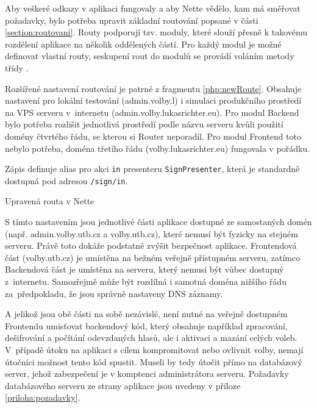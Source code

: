 Aby veškeré odkazy v aplikaci fungovaly a aby Nette vědělo, kam má směřovat požadavky, bylo potřeba upravit základní routování popsané v části \ref{section:routovani}. Routy podporují tzv. moduly, které slouží přesně k takovému rozdělení aplikace na několik oddělených částí. Pro každý modul je možné definovat vlastní routy, seskupení rout do modulů se provádí voláním metody  %
třídy . 

\bigskip

Rozšířené nastavení routování je patrné z fragmentu \ref{php:newRoute}. Obsahuje nastavení pro lokální testování (admin.volby.l) i simulaci produkčního prostředí na VPS serveru v~internetu (admin.volby.lukasrichter.eu). Pro modul Backend bylo potřeba rozlišit jednotlivá prostředí podle názvu serveru kvůli použití domény čtvrtého řádu, se kterou si Router neporadil. Pro modul Frontend toto nebylo potřeba, doména třetího řádu (volby.lukasrichter.eu) fungovala v pořádku. 

Zápis  definuje alias pro akci \texttt{in} presenteru \texttt{SignPresenter}, která je standardně dostupná pod adresou \texttt{/sign/in}.
\clearpage

\begin{listing}[ht]
\caption{Upravená routa v Nette}
\label{php:newRoute}
\end{listing}

S tímto nastavením jsou jednotlivé části aplikace dostupné ze samostaných domén (např. admin.volby.utb.cz a volby.utb.cz), které nemusí být fyzicky na stejném serveru. Právě toto dokáže podstatně zvýšit bezpečnost aplikace. Frontendová část (volby.utb.cz) je umístěna na bežném veřejně přístupném serveru, zatímco Backendová část je umístěna na serveru, který nemusí být vůbec dostupný z~internetu. Samozřejmě může být rozdílná i samotná doména nižšího řádu za~předpokladu, že jsou správně nastaveny DNS záznamy.

A jelikož jsou obě části na sobě nezávislé, není nutné na veřejně dostupném Frontendu umisťovat backendový kód, který obsahuje například zpracování, dešifrování a počítání odevzdaných hlasů, ale i aktivaci a mazání celých voleb. V~případě útoku na aplikaci s cílem kompromitovat nebo ovlivnit volby, nemají útočníci možnost tento kód spustit. Museli by tedy útočit přímo na databázový server, jehož zabezpečení je v komptenci administrátora serveru. Požadavky databázového serveru ze strany aplikace jsou uvedeny v příloze \ref{priloha:pozadavky}.